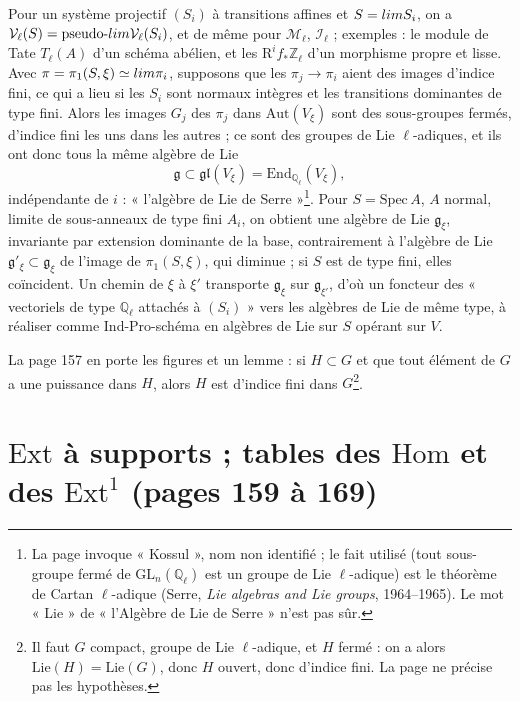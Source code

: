 \documentclass[11pt,a4paper]{article}
\begin{document}
Pour un système projectif $(S_i)$ à transitions affines et $S = \varprojlim S_i$,
on a $\mathcal{V}_\ell(S) = \text{pseudo-}\varinjlim \mathcal{V}_\ell(S_i)$, et de
même pour $\mathcal{M}_\ell$, $\mathcal{I}_\ell$ ; exemples : le module de Tate
$T_\ell(A)$ d'un schéma abélien, et les $\mathrm{R}^if_*\mathbb{Z}_\ell$ d'un
morphisme propre et lisse. Avec $\pi = \pi_1(S, \xi) \simeq \varprojlim \pi_i$,
supposons que les $\pi_j \to \pi_i$ aient des images d'indice fini, ce qui a lieu si
les $S_i$ sont normaux intègres et les transitions dominantes de type fini. Alors
les images $G_j$ des $\pi_j$ dans $\mathrm{Aut}(V_\xi)$ sont des sous-groupes fermés,
d'indice fini les uns dans les autres ; ce sont des groupes de Lie $\ell$-adiques,
et ils ont donc tous la même algèbre de Lie
\[
\mathfrak{g} \subset \mathfrak{gl}(V_\xi) = \mathrm{End}_{\mathbb{Q}_\ell}(V_\xi),
\]
indépendante de $i$ : « l'algèbre de Lie de Serre »\footnote{La page invoque
« Kossul », nom non identifié ; le fait utilisé (tout sous-groupe fermé de
$\mathrm{GL}_n(\mathbb{Q}_\ell)$ est un groupe de Lie $\ell$-adique) est le
théorème de Cartan $\ell$-adique (Serre, \emph{Lie algebras and Lie groups},
1964--1965). Le mot « Lie » de « l'Algèbre de Lie de Serre » n'est pas sûr.}.
Pour $S = \mathrm{Spec}\,A$, $A$ normal, limite de sous-anneaux de type fini
$A_i$, on obtient une algèbre de Lie $\mathfrak{g}_\xi$, invariante par extension
dominante de la base, contrairement à l'algèbre de Lie $\mathfrak{g}'_\xi \subset
\mathfrak{g}_\xi$ de l'image de $\pi_1(S, \xi)$, qui diminue ; si $S$ est de type
fini, elles coïncident. Un chemin de $\xi$ à $\xi'$ transporte $\mathfrak{g}_\xi$
sur $\mathfrak{g}_{\xi'}$, d'où un foncteur des « vectoriels de type
$\mathbb{Q}_\ell$ attachés à $(S_i)$ » vers les algèbres de Lie de même type, à
réaliser comme Ind-Pro-schéma en algèbres de Lie sur $S$ opérant sur $V$.

La page 157 en porte les figures et un lemme : si $H \subset G$ et que tout élément
de $G$ a une puissance dans $H$, alors $H$ est d'indice fini dans $G$\footnote{Il
faut $G$ compact, groupe de Lie $\ell$-adique, et $H$ fermé : on a alors
$\mathrm{Lie}(H) = \mathrm{Lie}(G)$, donc $H$ ouvert, donc d'indice fini. La page ne
précise pas les hypothèses.}.

\section*{$\mathrm{Ext}$ à supports ; tables des $\mathrm{Hom}$ et des $\mathrm{Ext}^1$ (pages 159 à 169)}
\end{document}
